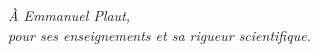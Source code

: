 
\thispagestyle{empty}


\vspace*{3cm}

\begin{flushright}
\textit{\`A Emmanuel Plaut,\\ pour ses enseignements et sa rigueur scientifique.}   
\end{flushright}